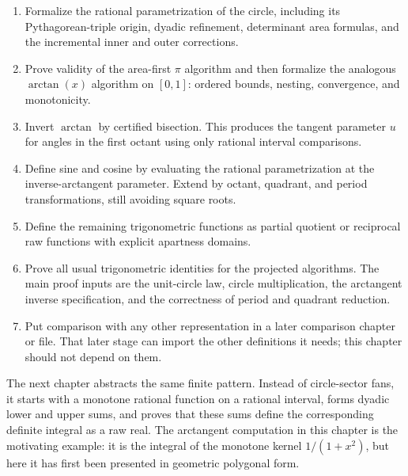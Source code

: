 \begin{enumerate}
  \item Formalize the rational parametrization of the circle, including its
  Pythagorean-triple origin, dyadic refinement, determinant area formulas, and
  the incremental inner and outer corrections.

  \item Prove validity of the area-first \(\pi\) algorithm and then formalize
  the analogous \(\arctan(x)\) algorithm on \([0,1]\): ordered bounds,
  nesting, convergence, and monotonicity.

  \item Invert \(\arctan\) by certified bisection.  This produces the tangent
  parameter \(u\) for angles in the first octant using only rational interval
  comparisons.

  \item Define sine and cosine by evaluating the rational parametrization at
  the inverse-arctangent parameter.  Extend by octant, quadrant, and period
  transformations, still avoiding square roots.

  \item Define the remaining trigonometric functions as partial quotient or
  reciprocal raw functions with explicit apartness domains.

  \item Prove all usual trigonometric identities for the projected algorithms.
  The main proof inputs are the unit-circle law, circle multiplication, the
  arctangent inverse specification, and the correctness of period and quadrant
  reduction.

  \item Put comparison with any other representation in a later comparison
  chapter or file.  That later stage can import the other definitions it
  needs; this chapter should not depend on them.
\end{enumerate}

The next chapter abstracts the same finite pattern.  Instead of circle-sector
fans, it starts with a monotone rational function on a rational interval,
forms dyadic lower and upper sums, and proves that these sums define the
corresponding definite integral as a raw real.  The arctangent computation in
this chapter is the motivating example: it is the integral of the monotone
kernel \(1/(1+x^2)\), but here it has first been presented in geometric
polygonal form.
